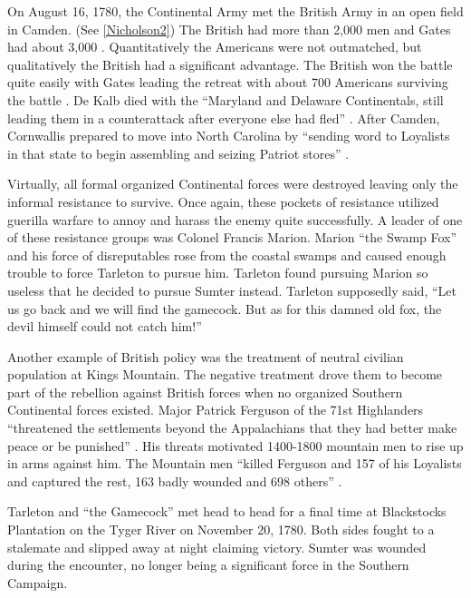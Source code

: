 On August 16, 1780, the Continental Army met the British Army in an open field
in Camden. (See \ref{Nicholson2}) The British had more than 2,000 men and Gates had
about 3,000 \cite[p.19]{weigley_partisan_1970}.  Quantitatively the Americans were not outmatched,
but qualitatively the British had a significant advantage.  The British won the
battle quite easily with Gates leading the retreat with about 700 Americans
surviving the battle \cite[p.21]{weigley_partisan_1970}.  De Kalb died with the “Maryland and
Delaware Continentals, still leading them in a counterattack after everyone else
had fled” \cite[p.21]{weigley_partisan_1970}.  After Camden, Cornwallis prepared to move into North
Carolina by “sending word to Loyalists in that state to begin assembling and
seizing Patriot stores” \cite[p.27]{woodward_comparative_2002}.

Virtually, all formal organized Continental forces were destroyed leaving only
the informal resistance to survive.  Once again, these pockets of resistance
utilized guerilla warfare to annoy and harass the enemy quite successfully.  A
leader of one of these resistance groups was Colonel Francis Marion.  Marion
“the Swamp Fox” and his force of disreputables rose from the coastal swamps and
caused enough trouble to force Tarleton to pursue him.  Tarleton found pursuing
Marion so useless that he decided to pursue Sumter instead.  Tarleton supposedly
said, “Let us go back and we will find the gamecock.  But as for this damned old
fox, the devil himself could not catch him!” \cite[p.23]{weigley_partisan_1970}

Another example of British policy was the treatment of neutral civilian
population at Kings Mountain.  The negative treatment drove them to become part
of the rebellion against British forces when no organized Southern Continental
forces existed.  Major Patrick Ferguson of the 71st Highlanders “threatened the
settlements beyond the Appalachians that they had better make peace or be
punished” \cite[p.24]{weigley_partisan_1970}.  His threats motivated 1400-1800 mountain men to rise
up in arms against him.  The Mountain men “killed Ferguson and 157 of his
Loyalists and captured the rest, 163 badly wounded and 698 others”
\cite[25]{weigley_partisan_1970}. 

Tarleton and “the Gamecock” met head to head for a final time at Blackstocks
Plantation on the Tyger River on November 20, 1780.  Both sides fought to a
stalemate and slipped away at night claiming victory.  Sumter was wounded during
the encounter, no longer being a significant force in the Southern Campaign. 

